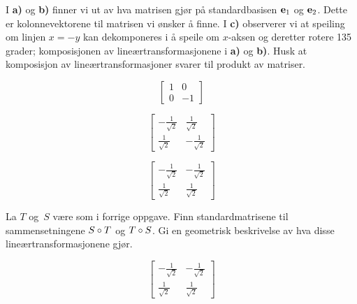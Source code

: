 \begin{losning}
I \textbf{a)} og \textbf{b)} finner vi ut av hva matrisen gjør på standardbasisen $\mathbf{e}_1$ og $\mathbf{e}_2$. Dette er kolonnevektorene til matrisen vi ønsker å finne. I \textbf{c)} observerer vi at speiling om linjen $x=-y$ kan dekomponeres i å speile om $x$-aksen og deretter rotere 135 grader; komposisjonen av lineærtransformasjonene i \textbf{a)} og \textbf{b)}. Husk at komposisjon av lineærtransformasjoner svarer til produkt av matriser.

\begin{punkt}
$$\begin{bmatrix}
1 & 0\\
0 & -1
\end{bmatrix}$$
\end{punkt}

\begin{punkt}
$$\begin{bmatrix}
-\frac{1}{\sqrt{2}} & \frac{1}{\sqrt{2}} \\
\frac{1}{\sqrt{2}}  & -\frac{1}{\sqrt{2}} 
\end{bmatrix}$$
\end{punkt}

\begin{punkt}
$$\begin{bmatrix}
-\frac{1}{\sqrt{2}} & -\frac{1}{\sqrt{2}} \\
\frac{1}{\sqrt{2}}  & \frac{1}{\sqrt{2}} 
\end{bmatrix}$$
\end{punkt}

\end{losning}


\begin{oppgave}
La $T$ og~$S$ være som i forrige oppgave.  Finn standardmatrisene til
sammensetningene $S \circ T$ og $T \circ S$.  Gi en geometrisk
beskrivelse av hva disse lineærtransformasjonene gjør.
\end{oppgave}

\begin{losning}
$$\begin{bmatrix}
-\frac{1}{\sqrt{2}} & -\frac{1}{\sqrt{2}} \\
\frac{1}{\sqrt{2}}  & \frac{1}{\sqrt{2}} 
\end{bmatrix}$$
\end{losning}


